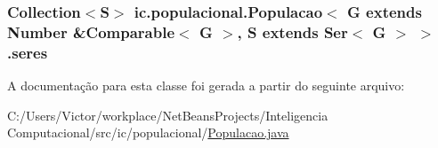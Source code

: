 \hypertarget{classic_1_1populacional_1_1_populacao_3_01_g_01extends_01_number_01_6_comparable_3_01_g_01_4_00_506237fa66af7bbd01f529b68d4beaca_a95b7dbe0db4e648740672366ee01877f}{
\subsubsection[{seres}]{\setlength{\rightskip}{0pt plus 5cm}Collection$<$S$>$ ic.\-populacional.\-Populacao$<$ G extends Number \&Comparable$<$ G $>$, S extends Ser$<$ G $>$ $>$.seres\hspace{0.3cm}{\ttfamily [protected]}}}\label{classic_1_1populacional_1_1_populacao_3_01_g_01extends_01_number_01_6_comparable_3_01_g_01_4_00_506237fa66af7bbd01f529b68d4beaca_a95b7dbe0db4e648740672366ee01877f}


A documentação para esta classe foi gerada a partir do seguinte arquivo\-:\begin{DoxyCompactItemize}
\item 
C\-:/\-Users/\-Victor/workplace/\-Net\-Beans\-Projects/\-Inteligencia Computacional/src/ic/populacional/\hyperlink{_populacao_8java}{Populacao.\-java}\end{DoxyCompactItemize}
